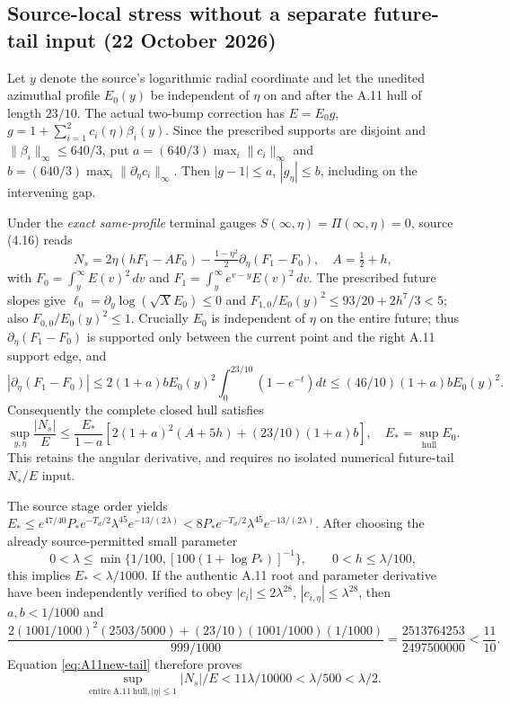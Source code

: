 \subsection*{Source-local stress without a separate future-tail input (22 October 2026)}
Let \(y\) denote the source's logarithmic radial coordinate and let the unedited azimuthal profile \(E_0(y)\) be independent of \(\eta\) on and after the A.11 hull of length \(23/10\). The actual two-bump correction has
\(E=E_0g\), \(g=1+\sum_{i=1}^2 c_i(\eta)\beta_i(y)\).
Since the prescribed supports are disjoint and
\(\|\beta_i\|_\infty\le640/3\), put
\(a=(640/3)\max_i\|c_i\|_\infty\) and
\(b=(640/3)\max_i\|\partial_\eta c_i\|_\infty\).
Then \(|g-1|\le a\), \(|g_\eta|\le b\), including on the intervening gap.

Under the \emph{exact same-profile} terminal gauges
\(S(\infty,\eta)=\Pi(\infty,\eta)=0\), source (4.16) reads
\[
N_s=2\eta(hF_1-AF_0)-\tfrac{1-\eta^2}{2}
\partial_\eta(F_1-F_0),\quad A=\tfrac12+h,
\]
with \(F_0=\int_y^\infty E(v)^2\,dv\) and
\(F_1=\int_y^\infty e^{v-y}E(v)^2\,dv\).
The prescribed future slopes give
\(\ell_0=\partial_y\log(\sqrt X E_0)\le0\) and
\(F_{1,0}/E_0(y)^2\le93/20+2h^7/3<5\);
also \(F_{0,0}/E_0(y)^2\le1\).
Crucially \(E_0\) is independent of \(\eta\) on the entire future;
thus \(\partial_\eta(F_1-F_0)\) is supported only between
the current point and the right A.11 support edge, and
\[
|\partial_\eta(F_1-F_0)|
\le2(1+a)b E_0(y)^2
\int_0^{23/10}(1-e^{-t})dt
\le(46/10)(1+a)bE_0(y)^2.
\]
Consequently the complete closed hull satisfies
\begin{equation}\label{eq:A11new-tail}
\sup_{y,\eta}\frac{|N_s|}{E}
\le\frac{E_*}{1-a}
\left[2(1+a)^2(A+5h)+(23/10)(1+a)b\right],
\quad E_*=\sup_{\mathrm{hull}}E_0.
\end{equation}
This retains the angular derivative, and requires no isolated
numerical future-tail \(N_s/E\) input.

The source stage order yields
\(E_*\le e^{47/40}P_*e^{-T_d/2}\lambda^{45}
e^{-13/(2\lambda)}
<8P_*e^{-T_d/2}\lambda^{45}e^{-13/(2\lambda)}\).
After choosing the already source-permitted small parameter
\[
0<\lambda\le\min\{1/100,[100(1+\log P_*)]^{-1}\},
\qquad 0<h\le\lambda/100,
\]
this implies \(E_*<\lambda/1000\). If the authentic A.11 root and
parameter derivative have been independently verified to obey
\(|c_i|\le2\lambda^{28}\),
\(|c_{i,\eta}|\le\lambda^{28}\),
then \(a,b<1/1000\) and
\[
\frac{2(1001/1000)^2(2503/5000)
 +(23/10)(1001/1000)(1/1000)}{999/1000}
=\frac{2513764253}{2497500000}<\frac{11}{10}.
\]
Equation \eqref{eq:A11new-tail} therefore proves
\[
\sup_{\mathrm{entire\ A.11\ hull},|\eta|\le1}|N_s|/E
<11\lambda/10000<\lambda/500<\lambda/2.
\]

